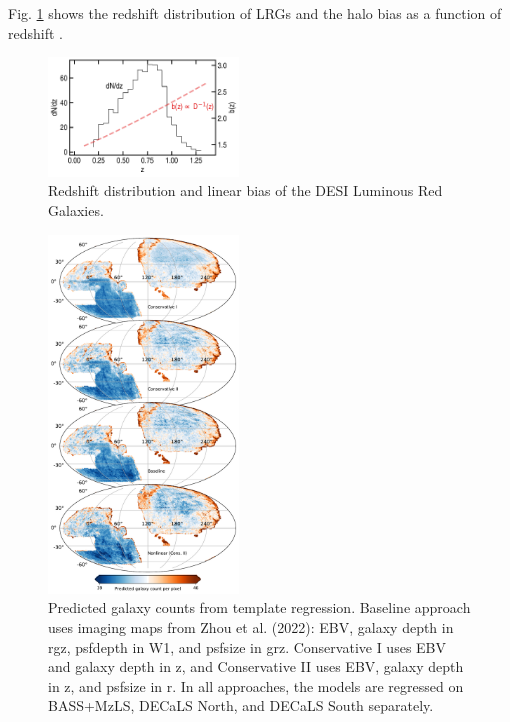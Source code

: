 Fig. \ref{fig:nz} shows the redshift distribution of LRGs and the halo bias as a function of redshift . 
\begin{figure}
    \centering
    \includegraphics[width=0.45\textwidth]{figures/nz_lrg.pdf}
    \caption{Redshift distribution and linear bias of the DESI Luminous Red Galaxies.}
    \label{fig:nz}
\end{figure}


\begin{figure}
    \centering
    \includegraphics[width=0.45\textwidth]{figures/npred.pdf}
    \caption{Predicted galaxy counts from template regression. Baseline approach uses imaging maps from Zhou et al. (2022): EBV, galaxy depth in rgz, psfdepth in W1, and psfsize in grz. Conservative I uses EBV and galaxy depth in z, and Conservative II uses EBV, galaxy depth in z, and psfsize in r. In all approaches, the models are regressed on BASS+MzLS, DECaLS North, and DECaLS South separately.}
    \label{fig:npred}
\end{figure}




